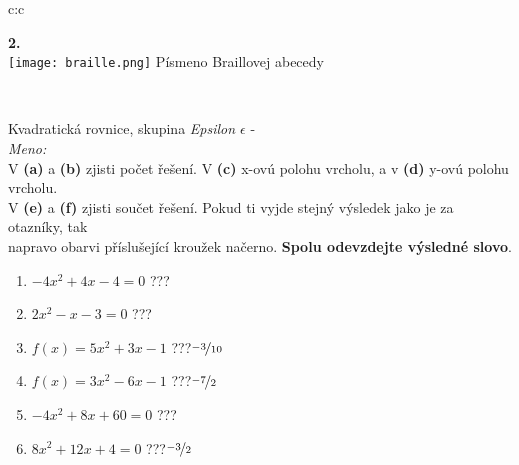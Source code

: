 \documentclass[10pt]{report}
\begin{document}
\begin{tabular}{c:c}
\begin{minipage}[c][99mm][t]{0.49\linewidth}
\begin{center}
\begin{minipage}{0.20\linewidth}
\begin{center}
{\Huge\bfseries 2.} \\[2mm]
\texttt{[image: braille.png]}
{\small Písmeno Braillovej abecedy}
\end{center}
\end{minipage}
\end{center}
\end{minipage}
\\ \hdashline
\begin{minipage}[c][99mm][t]{0.49\linewidth}
\begin{center}
\vspace{7mm}
{\huge Kvadratická rovnice, skupina \textit{Epsilon $\epsilon$} -}\\[4.5mm]
\textit{Meno:}\phantom{xxxxxxxxxxxxxxxxxxxxxxxxxxxxxxxxxxxxxxxxxxxxxxxxxxxxxxxxxxxxxxxxx}\\[3.5mm]
V \textbf{(a)} a \textbf{(b)} zjisti počet řešení. V \textbf{(c)} x-ovú polohu vrcholu, a v \textbf{(d)} y-ovú polohu vrcholu.\\V \textbf{(e)} a \textbf{(f)} zjisti součet řešení. Pokud ti vyjde stejný výsledek jako je za otazníky, tak\\napravo obarvi příslušející kroužek načerno. \textbf{Spolu odevzdejte výsledné slovo}.\\[3mm]
\begin{minipage}{0.77\linewidth}
\begin{center}
\begin{varwidth}{\textwidth}
\begin{enumerate}
\large
\item $-4x^2+4x-4=0$\quad \dotfill\; ???\;\dotfill {}
\item $2x^2-x-3=0$\quad \dotfill\; ???\;\dotfill {}
\item $f(x)=5x^2+3x-1$\quad \dotfill\; ???\;\dotfill \quad $\nicefrac{-3}{10}$
\item $f(x)=3x^2-6x-1$\quad \dotfill\; ???\;\dotfill \quad $\nicefrac{-7}{2}$
\item $-4x^2+8x+60=0$\quad \dotfill\; ???\;\dotfill {}
\item $8x^2+12x+4=0$\quad \dotfill\; ???\;\dotfill \quad $\nicefrac{-3}{2}$
\end{enumerate}
\end{varwidth}
\end{center}
\end{minipage}
\begin{minipage}{0.20\linewidth}
\begin{center}

\end{center}
\end{minipage}
\end{center}
\end{minipage}
\end{tabular}
\end{document}
